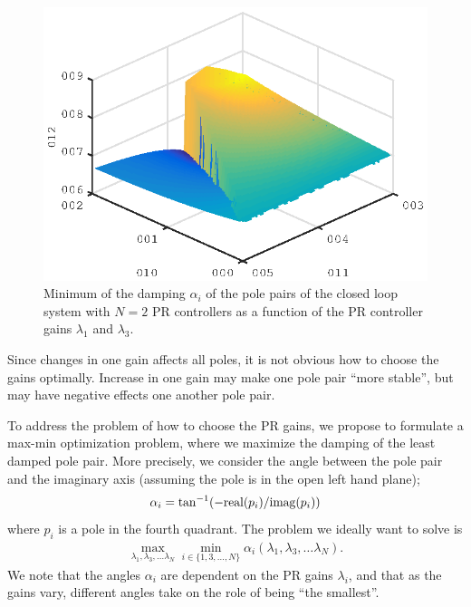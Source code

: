 \documentclass[conference,10pt]{IEEEtran}
\begin{document}
\begin{figure}[!h]
\centering

\includegraphics{fig/root_locus_2D_in_3D}
\caption{Minimum of the damping $\alpha_i$ of the pole pairs of the closed loop system with $N=2$ PR controllers as a function of the PR controller gains $\lambda_1$ and $\lambda_3$.}
\label{fig:DampingExample}
\end{figure}



Since changes in one gain affects all poles, it is not obvious how to choose the gains optimally. Increase in one gain may make one pole pair ``more stable'', but may have negative effects one another pole pair.

To address the problem of how to choose the PR gains, we propose to formulate a max-min optimization problem, where we maximize the damping of the least damped pole pair. More precisely, we consider the angle between the pole pair and the imaginary axis (assuming the pole is in the open left hand plane);
\begin{align*}
\alpha_i = \tan^{-1}(-{\rm real}(p_i) / {\rm imag}(p_i))
\end{align*}
where $p_i$ is a pole in the fourth quadrant. The problem we ideally want to solve is
\begin{align}
\label{eq:MaxMinProb}
\max_{\lambda_1,\lambda_3,\dots\lambda_N}\min_{i\in \{1,3,\dots,N\}} \alpha_i(\lambda_1,\lambda_3,\dots\lambda_N).
\end{align}
We note that the angles $\alpha_i$ are dependent on the PR gains $\lambda_i$, and that as the gains vary, different angles take on the role of being ``the smallest''.
\end{document}
